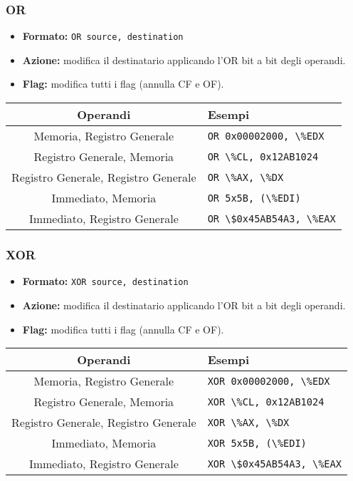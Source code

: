 \documentclass[a4paper,11pt]{article}
\begin{document}
\subsubsection{OR}
\begin{itemize}
	\item \textbf{Formato:} \lstinline|OR source, destination|
	\item \textbf{Azione:} modifica il destinatario applicando l'OR bit a bit degli operandi. 
	\item \textbf{Flag:} modifica tutti i flag (annulla CF e OF).
\end{itemize}

		\begin{table}[H]
		\center {}
			\begin{tabular} { c | p{5cm} }
				\bfseries Operandi & \bfseries Esempi \\
				\hline
				Memoria, Registro Generale & \lstinline|OR 0x00002000, \%EDX| \\ 
				Registro Generale, Memoria & \lstinline|OR \%CL, 0x12AB1024| \\ 
				Registro Generale, Registro Generale & \lstinline|OR \%AX, \%DX| \\ 
				Immediato, Memoria & \lstinline|OR 5x5B, (\%EDI)| \\ 
				Immediato, Registro Generale & \lstinline|OR \$0x45AB54A3, \%EAX|
			\end{tabular}
		\end{table}

\subsubsection{XOR}
\begin{itemize}
	\item \textbf{Formato:} \lstinline|XOR source, destination|
	\item \textbf{Azione:} modifica il destinatario applicando l'OR bit a bit degli operandi. 
	\item \textbf{Flag:} modifica tutti i flag (annulla CF e OF).
\end{itemize}

		\begin{table}[H]
		\center {}
			\begin{tabular} { c | p{5cm} }
				\bfseries Operandi & \bfseries Esempi \\
				\hline
				Memoria, Registro Generale & \lstinline|XOR 0x00002000, \%EDX| \\ 
				Registro Generale, Memoria & \lstinline|XOR \%CL, 0x12AB1024| \\ 
				Registro Generale, Registro Generale & \lstinline|XOR \%AX, \%DX| \\ 
				Immediato, Memoria & \lstinline|XOR 5x5B, (\%EDI)| \\ 
				Immediato, Registro Generale & \lstinline|XOR \$0x45AB54A3, \%EAX|
			\end{tabular}
		\end{table}
\end{document}
